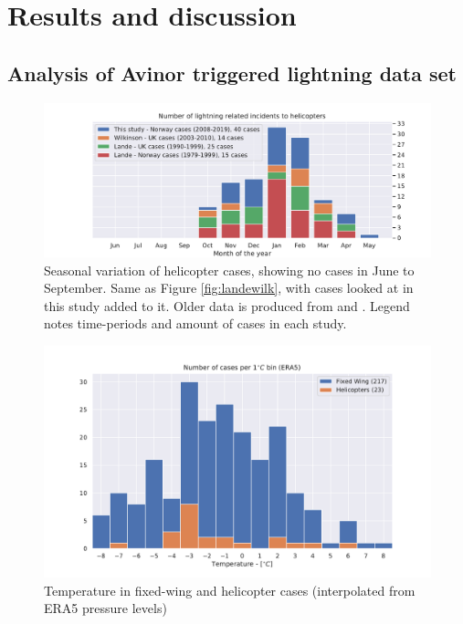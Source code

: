 \chapter{Results and discussion}

\section{Analysis of Avinor triggered lightning data set}\label{sec:avinor}

\begin{figure}
    \centering
    \includegraphics[width=\textwidth]{Figures/yearlydistribution.pdf}
    \caption{Seasonal variation of helicopter cases, showing no cases in June to September. Same as Figure \ref{fig:landewilk}, with cases looked at in this study added to it. Older data is produced from \cite{lande1999} and \cite{wilkinson2013}. Legend notes time-periods and amount of cases in each study. }
    \label{fig:yearlyvariation}
\end{figure}

\begin{figure}
    \centering
    \includegraphics[width=\textwidth]{Figures/temperature.pdf}
    \caption{Temperature in fixed-wing and helicopter cases (interpolated from ERA5 pressure levels)}
    \label{fig:temperatureera5}
\end{figure}


